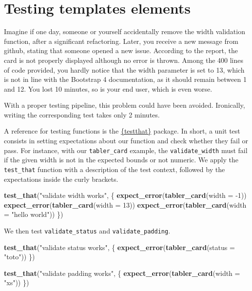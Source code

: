 \documentclass[
]{book}
\newenvironment{Shaded}{\begin{snugshade}}{\end{snugshade}}
\newcommand{\DataTypeTok}[1]{\textcolor[rgb]{0.13,0.29,0.53}{#1}}
\newcommand{\DecValTok}[1]{\textcolor[rgb]{0.00,0.00,0.81}{#1}}
\newcommand{\KeywordTok}[1]{\textcolor[rgb]{0.13,0.29,0.53}{\textbf{#1}}}
\newcommand{\NormalTok}[1]{#1}
\newcommand{\StringTok}[1]{\textcolor[rgb]{0.31,0.60,0.02}{#1}}
\begin{document}
\hypertarget{testing-templates-elements}{%
\section{Testing templates elements}\label{testing-templates-elements}}

Imagine if one day, someone or yourself accidentally remove the width validation function, after a significant refactoring. Later, you receive a new message from github, stating that someone opened a new issue. According to the report, the card is not properly displayed although no error is thrown. Among the 400 lines of code provided, you hardly notice that the width parameter is set to 13, which is not in line with the Bootstrap 4 documentation, as it should remain between 1 and 12. You lost 10 minutes, so is your end user, which is even worse.

With a proper testing pipeline, this problem could have been avoided. Ironically, writing the corresponding test takes only 2 minutes.

A reference for testing functions is the \href{https://testthat.r-lib.org/index.html}{\{testthat\}} package. In short, a unit test consists in setting expectations about our function and check whether they fail or pass. For instance, with our \texttt{tabler\_card} example, the \texttt{validate\_width} must fail if the given width is not in the expected bounds or not numeric. We apply the \texttt{test\_that} function with a description of the test context, followed by the expectations inside the curly brackets.

\begin{Shaded}
\begin{Highlighting}[]
\KeywordTok{test_that}\NormalTok{(}\StringTok{"validate width works"}\NormalTok{, \{}
  \KeywordTok{expect_error}\NormalTok{(}\KeywordTok{tabler_card}\NormalTok{(}\DataTypeTok{width =} \DecValTok{-1}\NormalTok{))}
  \KeywordTok{expect_error}\NormalTok{(}\KeywordTok{tabler_card}\NormalTok{(}\DataTypeTok{width =} \DecValTok{13}\NormalTok{))}
  \KeywordTok{expect_error}\NormalTok{(}\KeywordTok{tabler_card}\NormalTok{(}\DataTypeTok{width =} \StringTok{"hello world"}\NormalTok{))}
\NormalTok{\})}
\end{Highlighting}
\end{Shaded}

We then test \texttt{validate\_status} and \texttt{validate\_padding}.

\begin{Shaded}
\begin{Highlighting}[]
\KeywordTok{test_that}\NormalTok{(}\StringTok{"validate status works"}\NormalTok{, \{}
  \KeywordTok{expect_error}\NormalTok{(}\KeywordTok{tabler_card}\NormalTok{(}\DataTypeTok{status =} \StringTok{"toto"}\NormalTok{))}
\NormalTok{\})}

\KeywordTok{test_that}\NormalTok{(}\StringTok{"validate padding works"}\NormalTok{, \{}
  \KeywordTok{expect_error}\NormalTok{(}\KeywordTok{tabler_card}\NormalTok{(}\DataTypeTok{width =} \StringTok{"xs"}\NormalTok{))}
\NormalTok{\})}
\end{Highlighting}
\end{Shaded}
\end{document}
